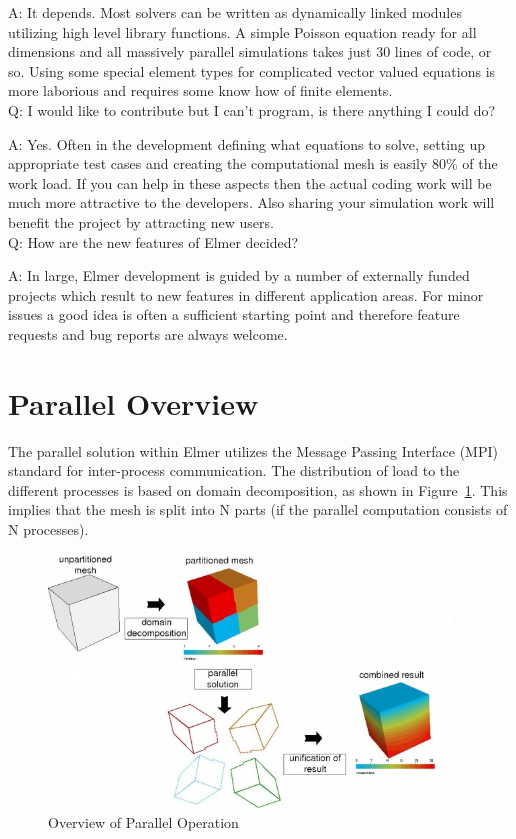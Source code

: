     A: It depends. Most solvers can be written as dynamically linked modules utilizing high level library functions. A simple Poisson equation ready for all dimensions and all massively parallel simulations takes just 30 lines of code, or so. Using some special element types for complicated vector valued equations is more laborious and requires some know how of finite elements.\\

    Q: I would like to contribute but I can't program, is there anything I could do?

    A: Yes. Often in the development defining what equations to solve, setting up appropriate test cases and creating the computational mesh is easily 80\% of the work load. If you can help in these aspects then the actual coding work will be much more attractive to the developers. Also sharing your simulation work will benefit the project by attracting new users.\\

    Q: How are the new features of Elmer decided?

    A: In large, Elmer development is guided by a number of externally funded projects which result to new features in different application areas. For minor issues a good idea is often a sufficient starting point and therefore feature requests and bug reports are always welcome.

\section{Parallel Overview}

The parallel solution within Elmer utilizes the Message Passing Interface (MPI) standard for inter-process communication. The distribution of load to the different processes is based on domain decomposition, as shown in Figure~\ref{fg:concept}. This implies that the mesh is split into N parts (if the parallel computation consists of N processes). 

\begin{figure}[H]
\centering
\includegraphics[width=0.95\textwidth]{Parallelconcept}
\caption{Overview of Parallel Operation}\label{fg:concept}
\end{figure}

